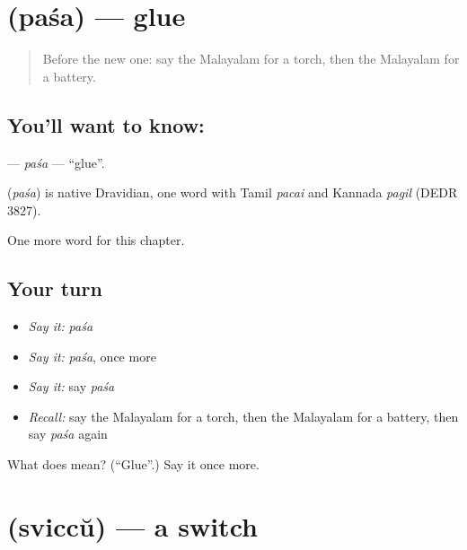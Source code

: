 \section[\texorpdfstring{\ml{പശ} (paśa)}{പശ (paśa)}]{ (paśa) — glue}

\label{lesson:ML-C214-pasa}



\begin{quote}
Before the new one: say the Malayalam for a torch, then the Malayalam for a battery.
\end{quote}

\subsection*{You'll want to know: }
\textbf{} — \emph{paśa} — \textquotedblleft{}glue\textquotedblright{}.

\begin{cousinweb}
\textbf{} (\emph{paśa}) is native Dravidian, one word with Tamil \emph{pacai} and Kannada \emph{pagil} (DEDR 3827).
\end{cousinweb}

\begin{grammarlens}[title={What you've built}]
One more word for this chapter.
\end{grammarlens}

\subsection*{Your turn}
\begin{itemize}
\raggedright
  \item \emph{Say it:} \emph{paśa}
  \item \emph{Say it:} \emph{paśa}, once more
  \item \emph{Say it:} say \emph{paśa}
  \item \emph{Recall:} say the Malayalam for a torch, then the Malayalam for a battery, then say \emph{paśa} again
\end{itemize}

\begin{tcolorbox}[breakable,colback=teal!4,colframe=teal!35!black,title={Before you move on}]
What does  mean? (\textquotedblleft{}Glue\textquotedblright{}.) Say it once more.
\end{tcolorbox}
\section[\texorpdfstring{\ml{സ്വിച്ച്} (sviccŭ)}{സ്വിച്ച് (sviccŭ)}]{ (sviccŭ) — a switch}

